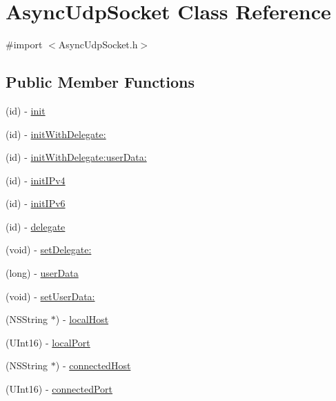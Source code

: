\hypertarget{interface_async_udp_socket}{
\section{AsyncUdpSocket Class Reference}
\label{interface_async_udp_socket}
}


{\ttfamily \#import $<$AsyncUdpSocket.h$>$}

\subsection*{Public Member Functions}
\begin{DoxyCompactItemize}
\item 
(id) -\/ \hyperlink{interface_async_udp_socket_a4213bb26f5207ee3f402fe463badc691}{init}
\item 
(id) -\/ \hyperlink{interface_async_udp_socket_a918ea9d2f36714a76a7f19a5213a0473}{initWithDelegate:}
\item 
(id) -\/ \hyperlink{interface_async_udp_socket_a65ebd73324c0920a291449a38e2ff3ff}{initWithDelegate:userData:}
\item 
(id) -\/ \hyperlink{interface_async_udp_socket_af151778aad87c68e8270e38f02fa7b40}{initIPv4}
\item 
(id) -\/ \hyperlink{interface_async_udp_socket_a5c9685a737ef357f854710a55647be7f}{initIPv6}
\item 
(id) -\/ \hyperlink{interface_async_udp_socket_a6c98e239b6ba279cfc95c64db9de555c}{delegate}
\item 
(void) -\/ \hyperlink{interface_async_udp_socket_a5147f10c2f5e0df2682c4ce073138ac8}{setDelegate:}
\item 
(long) -\/ \hyperlink{interface_async_udp_socket_ad5ec7ee01c3a572cf338782460044b21}{userData}
\item 
(void) -\/ \hyperlink{interface_async_udp_socket_a3e2af6a69a1c75cb9b228c871ade8419}{setUserData:}
\item 
(NSString $\ast$) -\/ \hyperlink{interface_async_udp_socket_a544fa124053aea063a8be148cf24d491}{localHost}
\item 
(UInt16) -\/ \hyperlink{interface_async_udp_socket_a1b6cdcf368d68e9ffb28e359e5c23ce8}{localPort}
\item 
(NSString $\ast$) -\/ \hyperlink{interface_async_udp_socket_a918b8d6a97c1f0a2cd938cc61d3ff353}{connectedHost}
\item 
(UInt16) -\/ \hyperlink{interface_async_udp_socket_a2337a76e32d4e2836888e58723977b7e}{connectedPort}

\end{DoxyCompactItemize}
